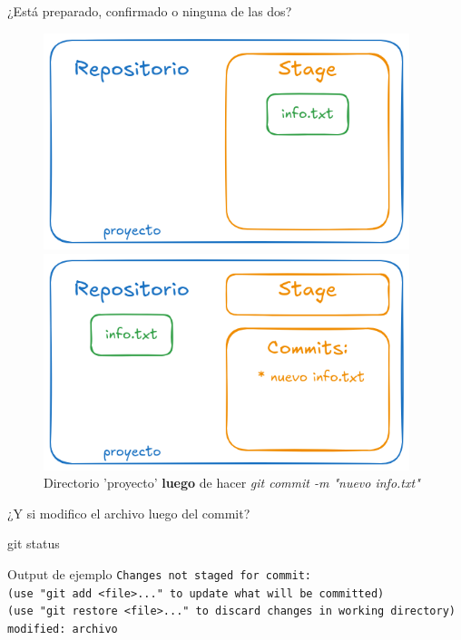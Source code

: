 \begin{frame}{¿Está preparado, confirmado o ninguna de las dos?}
    \begin{figure}
    \centering
    \begin{minipage}{0.45\textwidth}
        \centering        \includegraphics[width=0.95\textwidth]{graficos/stage_2.png} 
        \caption{Directorio 'proyecto' \textbf{antes} de hacer \textit{commit}}
    \end{minipage}\hfill
    \begin{minipage}{0.45\textwidth}
        \centering        \includegraphics[width=0.95\textwidth]{graficos/commit.png} 
        \caption{Directorio 'proyecto' \textbf{luego} de hacer \textit{git commit -m "nuevo info.txt"}}
    \end{minipage}
\end{figure}
\end{frame}

\begin{frame}{¿Y si modifico el archivo luego del commit?}
    \begin{comando}
        git status
    \end{comando}
    \begin{block}{Output de ejemplo}
    \centering
        \texttt{Changes not staged for commit:\\
  (use "git add <file>..." to update what will be committed)\\
  (use "git restore <file>..." to discard changes in working directory)\\
	modified:   archivo}
    \end{block}  
\end{frame}

